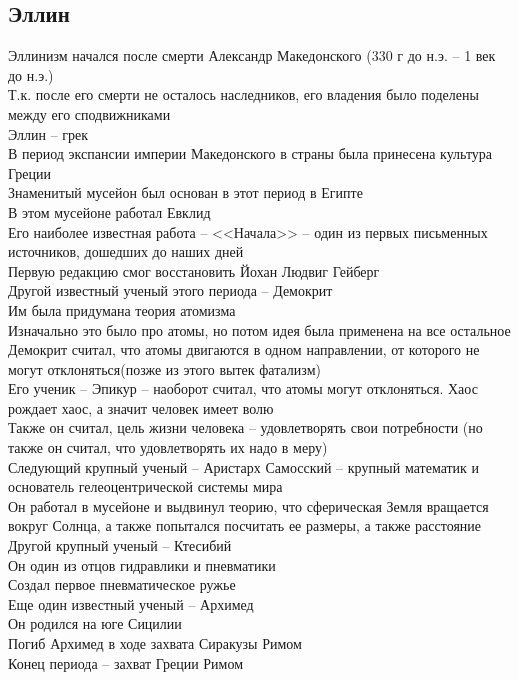 \documentclass[12pt]{article}
\begin{document}
\subsection{Эллин}
Эллинизм начался после смерти Александр Македонского (330 г до н.э. -- 1 век до н.э.)\\
Т.к. после его смерти не осталось наследников, его владения было поделены между его сподвижниками\\
Эллин -- грек\\
В период экспансии империи Македонского в страны была принесена культура Греции\\
Знаменитый мусейон был основан в этот период в Египте\\
В этом мусейоне работал Евклид\\
Его наиболее известная работа -- <<Начала>> -- один из первых письменных источников, дошедших до наших дней\\
Первую редакцию смог восстановить Йохан Людвиг Гейберг \\
Другой известный ученый этого периода -- Демокрит\\
Им была придумана теория атомизма\\
Изначально это было про атомы, но потом идея была применена на все остальное\\
Демокрит считал, что атомы двигаются в одном направлении, от которого не могут отклоняться(позже из этого вытек фатализм)\\
Его ученик -- Эпикур -- наоборот считал, что атомы могут отклоняться. Хаос рождает хаос, а значит человек имеет волю\\
Также он считал, цель жизни человека -- удовлетворять свои потребности (но также он считал, что удовлетворять их надо в меру)\\
Следующий крупный ученый -- Аристарх Самосский -- крупный математик и основатель гелеоцентрической системы мира\\
Он работал в мусейоне и выдвинул теорию, что сферическая Земля вращается вокруг Солнца, а также попытался посчитать ее размеры, а также расстояние\\
Другой крупный ученый -- Ктесибий\\
Он один из отцов гидравлики и пневматики\\
Создал первое пневматическое ружье\\
Еще один известный ученый -- Архимед\\
Он родился на юге Сицилии\\
Погиб Архимед в ходе захвата Сиракузы Римом\\
Конец периода -- захват Греции Римом
\end{document}
